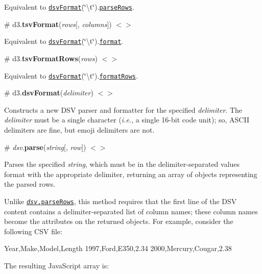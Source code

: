 Equivalent to \href{#dsvFormat}{\tt dsv\+Format}(\char`\"{}\textbackslash{}t\char`\"{}).\href{#dsv_parseRows}{\tt parse\+Rows}.

\label{_tsvFormat}%
\# d3.{\bfseries tsv\+Format}({\itshape rows}\mbox{[}, {\itshape columns}\mbox{]}) \href{https://github.com/d3/d3-dsv/blob/master/src/tsv.js#L7}{\tt $<$$>$}

Equivalent to \href{#dsvFormat}{\tt dsv\+Format}(\char`\"{}\textbackslash{}t\char`\"{}).\href{#dsv_format}{\tt format}.

\label{_tsvFormatRows}%
\# d3.{\bfseries tsv\+Format\+Rows}({\itshape rows}) \href{https://github.com/d3/d3-dsv/blob/master/src/tsv.js#L8}{\tt $<$$>$}

Equivalent to \href{#dsvFormat}{\tt dsv\+Format}(\char`\"{}\textbackslash{}t\char`\"{}).\href{#dsv_formatRows}{\tt format\+Rows}.

\label{_dsvFormat}%
\# d3.{\bfseries dsv\+Format}({\itshape delimiter}) \href{https://github.com/d3/d3-dsv/blob/master/src/dsv.js#L30}{\tt $<$$>$}

Constructs a new D\+SV parser and formatter for the specified {\itshape delimiter}. The {\itshape delimiter} must be a single character ({\itshape i.\+e.}, a single 16-\/bit code unit); so, A\+S\+C\+II delimiters are fine, but emoji delimiters are not.

\label{_dsv_parse}%
\# {\itshape dsv}.{\bfseries parse}({\itshape string}\mbox{[}, {\itshape row}\mbox{]}) \href{https://github.com/d3/d3-dsv/blob/master/src/dsv.js#L34}{\tt $<$$>$}

Parses the specified {\itshape string}, which must be in the delimiter-\/separated values format with the appropriate delimiter, returning an array of objects representing the parsed rows.

Unlike \href{#dsv_parseRows}{\tt {\itshape dsv}.parse\+Rows}, this method requires that the first line of the D\+SV content contains a delimiter-\/separated list of column names; these column names become the attributes on the returned objects. For example, consider the following C\+SV file\+:


\begin{DoxyCode}
Year,Make,Model,Length
1997,Ford,E350,2.34
2000,Mercury,Cougar,2.38
\end{DoxyCode}


The resulting Java\+Script array is\+:


\begin{DoxyCode}
\end{DoxyCode}


